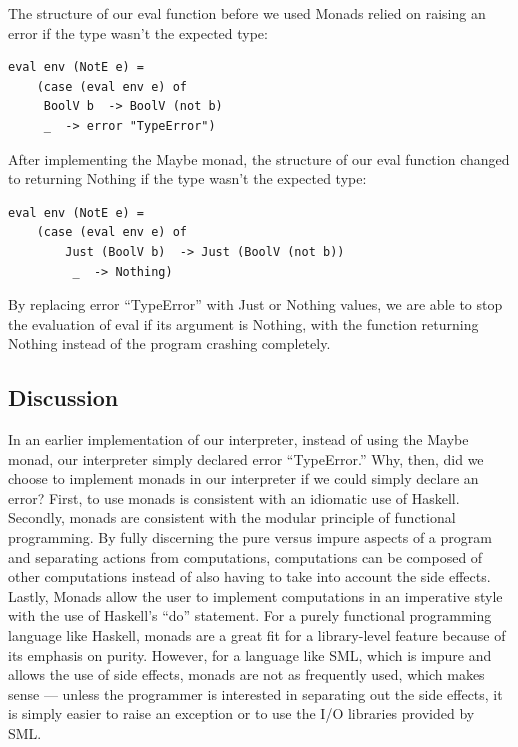 \documentclass[journal]{IEEEtran}
\begin{document}
The structure of our eval function before we used Monads relied on raising an error if the type wasn't the expected type: 
\begin{verbatim}
eval env (NotE e) = 
    (case (eval env e) of
     BoolV b  -> BoolV (not b)
     _  -> error "TypeError")

\end{verbatim}


After implementing the Maybe monad, the structure of our eval function changed to returning Nothing if the type wasn't the expected type: 
\small
\begin{verbatim}
eval env (NotE e) = 
    (case (eval env e) of
        Just (BoolV b)  -> Just (BoolV (not b))
         _  -> Nothing)

\end{verbatim}
\normalsize

By replacing error “TypeError” with Just or Nothing values, we are able to stop the evaluation of eval if its argument is Nothing, with the function returning Nothing instead of the program crashing completely. 
\subsection*{Discussion}
In an earlier implementation of our interpreter, instead of using the Maybe monad, our interpreter simply declared error “TypeError.” Why, then, did we choose to implement monads in our interpreter if we could simply declare an error? First, to use monads is consistent with an idiomatic use of Haskell. Secondly, monads are consistent with the modular principle of functional programming. By fully discerning the pure versus impure aspects of a program and separating actions from computations, computations can be composed of other computations instead of also having to take into account the side effects. Lastly, Monads allow the user to implement computations in an imperative style with the use of Haskell's “do” statement. For a purely functional programming language like Haskell, monads are a great fit for a library-level feature because of its emphasis on purity. However, for a language like SML, which is impure and allows the use of side effects, monads are not as frequently used, which makes sense — unless the programmer is interested in separating out the side effects, it is simply easier to raise an exception or to use the I/O libraries provided by SML.
\end{document}

